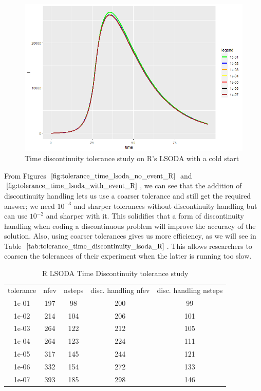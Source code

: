 \begin{figure}[h]
	\centering
	\includegraphics[width=0.7\linewidth]{./figures/tolerance_time_lsoda_with_event_R}
	\caption{Time discontinuity tolerance study on R's LSODA with a cold start}
	\label{fig:tolerance_time_lsoda_with_event_R}
\end{figure}

From Figures $\ref{fig:tolerance_time_lsoda_no_event_R}$ and $\ref{fig:tolerance_time_lsoda_with_event_R}$, we can see that the addition of discontinuity handling lets us use a coarser tolerance and still get the required answer; we need $10^{-3}$ and sharper tolerances without discontinuity handling but can use $10^{-2}$ and sharper with it. This solidifies that a form of discontinuity handling when coding a discontinuous problem will improve the accuracy of the solution. Also, using coarser tolerances gives us more efficiency, as we will see in Table $\ref{tab:tolerance_time_discontinuity_lsoda_R}$. This allows researchers to coarsen the tolerances of their experiment when the latter is running too slow.

\begin{table}[h]
\caption {R LSODA Time Discontinuity tolerance study} \label{tab:tolerance_time_discontinuity_lsoda_R} 
\begin{center}
\begin{tabular}{ c c c c c }
tolerance & nfev & nsteps &  disc. handling nfev &  disc. handling nsteps \\ 
1e-01 & 197 &  98 & 200 &  99 \\
1e-02 & 214 & 104 & 206 & 101 \\
1e-03 & 264 & 122 & 212 & 105 \\
1e-04 & 264 & 123 & 224 & 111 \\
1e-05 & 317 & 145 & 244 & 121 \\
1e-06 & 332 & 154 & 272 & 133 \\
1e-07 & 393 & 185 & 298 & 146 \\
\end{tabular}
\end{center}
\end{table}

